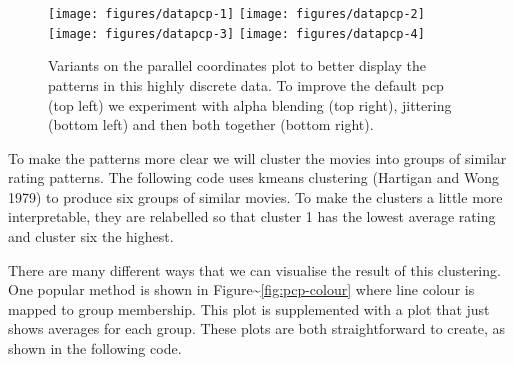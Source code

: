 \begin{figure}
\texttt{[image: figures/datapcp-1]} \texttt{[image: figures/datapcp-2]} \texttt{[image: figures/datapcp-3]} \texttt{[image: figures/datapcp-4]} \caption{Variants on the parallel coordinates plot to better display the patterns in this highly discrete data.  To improve the default pcp (top left) we experiment with alpha blending (top right), jittering (bottom left) and then both together (bottom right).\label{fig:pcp}}
\end{figure}

To make the patterns more clear we will cluster the movies into groups
of similar rating patterns. The following code uses kmeans clustering
(Hartigan and Wong 1979) to produce six groups of similar movies. To
make the clusters a little more interpretable, they are relabelled so
that cluster 1 has the lowest average rating and cluster six the
highest. 

\begin{Shaded}
\begin{Highlighting}[]
\StringTok{ }\NormalTok{(ratings[}\NormalTok{:}\NormalTok{], }\NormalTok{)}
\StringTok{ }\NormalTok{(}
\StringTok{ }\NormalTok{(}
\StringTok{ }
\end{Highlighting}
\end{Shaded}

There are many different ways that we can visualise the result of this
clustering. One popular method is shown in
Figure\textasciitilde{}\ref{fig:pcp-colour} where line colour is mapped
to group membership. This plot is supplemented with a plot that just
shows averages for each group. These plots are both straightforward to
create, as shown in the following code.

\begin{Shaded}
\begin{Highlighting}[]
\StringTok{ }
    
\StringTok{ }\NormalTok{(}  \NormalTok{/}\NormalTok{)}
\StringTok{ }\NormalTok{(}\NormalTok{(}  
   \NormalTok{)}
\end{Highlighting}
\end{Shaded}

